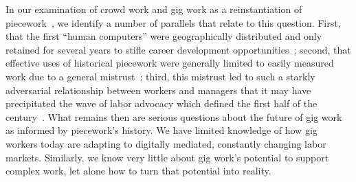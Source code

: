 \documentclass{article}
\newcommand{\topic}[1]{{\color{Blue}#1}}
\begin{document}
\begin{comment}
\topic{As yet,
Will their fates follow those of historical offline pieceworkers,
or will the affordances of the online world result in different outcomes?
In our most recent work~\cite{pieceworkCrowdworkGigwork}, we argue that
the trajectory of historical pieceworkers can substantively inform the trajectory of gig work today,
but that we must take an active role in the design and development of these platforms
--- that is, taking advantage of the potential to influence the entire architectures as \citeauthor{lessig2006code} points out~\cite{lessig2006code}.
\end{comment}

\topic{In our examination of crowd work and gig work as a reinstantiation of piecework~\cite{pieceworkCrowdworkGigwork}, we identify a number of parallels that relate to this question.}
First, that the first ``human computers'' were geographically distributed and only retained for several years to stifle career development opportunities~\cite{grier2013computers};
second, that effective uses of historical piecework were generally limited to easily measured work due to a general mistrust~\cite{american1921problem,richards1904anything};
third, this mistrust led to such a starkly adversarial relationship between workers and managers that
it may have precipitated the wave of labor advocacy which defined the first half of the  century~\cite{hart2013rise,hart2016rise}.
What remains then are serious questions about the future of gig work as informed by piecework's history.
We have limited knowledge of how gig workers today are adapting to digitally mediated, constantly changing labor markets.
Similarly, we know very little about gig work's potential to support complex work, let alone how to turn that potential into reality.
\end{document}

